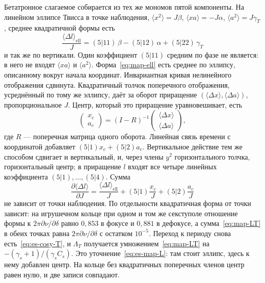 Бетатронное слагаемое собирается из тех же мономов пятой компоненты. На линейном эллипсе Твисса в точке наблюдения, $\langle x^2\rangle=J\beta$, $\langle xa\rangle=-J\alpha$, $\langle a^2\rangle=J\gamma_T$, среднее квадратичной формы есть
\begin{equation}
\label{eq:map-ell}
\frac{\langle\Delta l\rangle_{\mathrm{ell}}}{J}
=
(5|11)\,\beta-(5|12)\,\alpha+(5|22)\,\gamma_T
\end{equation}
и так же по вертикали. Один коэффициент $(5|11)$ средним по фазе не является: в него не входят $\langle xa\rangle$ и $\langle a^2\rangle$. Форма~\eqref{eq:map-ell} есть среднее по эллипсу, описанному вокруг начала координат. Инвариантная кривая нелинейного отображения сдвинута. Квадратичный толчок поперечного отображения, усреднённый по тому же эллипсу, даёт за оборот приращение $(\langle\Delta x\rangle,\langle\Delta a\rangle)$, пропорциональное $J$. Центр, который это приращение уравновешивает, есть
\begin{equation}
\label{eq:map-centre}
\begin{pmatrix}x_c\\ a_c\end{pmatrix}
=
(I-R)^{-1}
\begin{pmatrix}\langle\Delta x\rangle\\ \langle\Delta a\rangle\end{pmatrix},
\end{equation}
где $R$ --- поперечная матрица одного оборота. Линейная связь времени с координатой добавляет $(5|1)x_c+(5|2)a_c$. Вертикальное действие тем же способом сдвигает и вертикальный, и, через члены $y^2$ горизонтального толчка, горизонтальный центр; в приращение $l$ входят все четыре линейных коэффициента $(5|1),\ldots,(5|4)$. Сумма
\begin{equation}
\label{eq:map-LT}
\frac{\partial\langle\Delta l\rangle}{\partial J}
=
\frac{\langle\Delta l\rangle_{\mathrm{ell}}}{J}
+(5|1)\frac{x_c}{J}+(5|2)\frac{a_c}{J}
\end{equation}
не зависит от точки наблюдения. По отдельности квадратичная форма от точки зависит: на игрушечном кольце при одном и том же секступоле отношение формы к $2\pi\partial\nu/\partial\delta$ равно $0{,}853$ в фокусе и $0{,}881$ в дефокусе, а сумма~\eqref{eq:map-LT} в обеих точках равна $2\pi\partial\nu/\partial\delta$ с остатком $10^{-5}$. Переход к периоду снова есть~\eqref{eq:es-cosy-T}, и $\Lambda_T$ получается умножением~\eqref{eq:map-LT} на $-(\gamma_s+1)/(\gamma_s C_s)$. Это уточнение~\eqref{eq:es-map-L}: там стоит эллипс, здесь к нему добавлен центр. На кольце без квадратичных поперечных членов центр равен нулю, и две записи совпадают.

